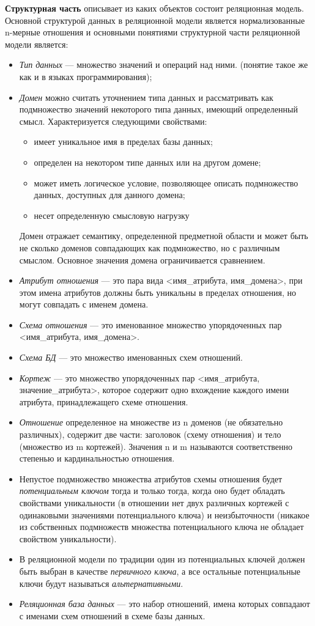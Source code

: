\textbf{Структурная часть} описывает из каких объектов состоит реляционная модель. Основной структурой данных в реляционной модели является нормализованные n-мерные отношения и основными понятиями структурной части реляционной модели является:
\begin{itemize}
	\item \textit{Тип данных} --- множество значений и операций над ними. (понятие такое же как и в языках программирования);
	\item \textit{Домен} можно считать уточнением типа данных и рассматривать как подмножество значений некоторого типа данных, имеющий определенный смысл. 
	Характеризуется следующими свойствами:
	\begin{itemize}
		\item имеет уникальное имя в пределах базы данных;
		\item определен на некотором типе данных или на другом домене;
		\item может иметь логическое условие, позволяющее описать подмножество данных, доступных для данного домена;
		\item несет определенную смысловую нагрузку
	\end{itemize}
	Домен отражает семантику, определенной предметной области и может быть не сколько доменов совпадающих как подмножество, но с различным смыслом. Основное значения домена ограничивается сравнением.
	\item \textit{Атрибут отношения} --- это пара вида <имя\_атрибута, имя\_домена>, при этом имена атрибутов должны быть уникальны в пределах отношения, но могут совпадать с именем домена.
	\item \textit{Схема отношения} --- это именованное множество упорядоченных пар <имя\_атрибута, имя\_домена>.
	\item \textit{Схема БД} --- это множество именованных схем отношений.
	\item \textit{Кортеж} --- это множество упорядоченных пар <имя\_атрибута, значение\_атрибута>, которое содержит одно вхождение каждого имени атрибута, принадлежащего схеме отношения.
	\item \textit{Отношение} определенное на множестве из n доменов (не обязательно различных), содержит две части: заголовок (схему отношения) и тело (множество из m кортежей). Значения n и m называются соответственно степенью и кардинальностью отношения.
	\item Непустое подмножество множества атрибутов схемы отношения будет \textit{потенциальным ключом} тогда и только тогда, 
	когда оно будет обладать свойствами уникальности (в отношении нет двух различных кортежей с одинаковыми 
	значениями потенциального ключа) и неизбыточности (никакое из собственных подмножеств множества 
	потенциального ключа не обладает свойством уникальности). 
	\item В реляционной модели по традиции один из потенциальных ключей должен быть выбран в качестве \textit{первичного ключа}, а все остальные потенциальные ключи будут называться \textit{альтернативными}.
	\item \textit{Реляционная база данных} --- это набор отношений, имена которых совпадают с именами схем отношений в схеме базы данных.
\end{itemize}

